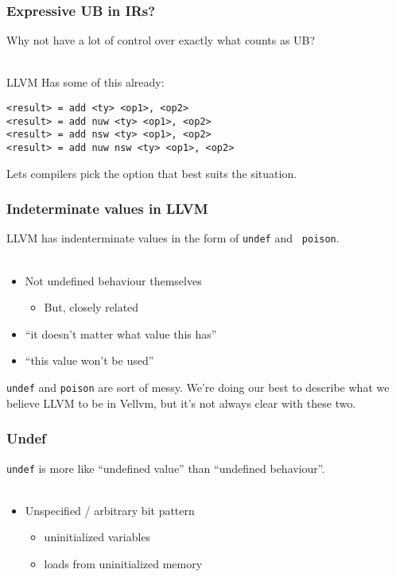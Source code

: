 \documentclass[handout]{beamer}
\begin{document}
\begin{frame}[fragile]
  \frametitle{Expressive UB in IRs?}

  Why not have a lot of control over exactly what counts as UB?\\~

  \pause

  LLVM Has some of this already:

\begin{verbatim}
<result> = add <ty> <op1>, <op2>
<result> = add nuw <ty> <op1>, <op2>
<result> = add nsw <ty> <op1>, <op2>
<result> = add nuw nsw <ty> <op1>, <op2>
\end{verbatim}

  Lets compilers pick the option that best suits the situation.
\end{frame}

\begin{frame}
  \frametitle{Indeterminate values in LLVM}

  LLVM has indenterminate values in the form of {\tt undef} and {\tt
    poison}.\\~

  \begin{itemize}
  \item Not undefined behaviour themselves
    \begin{itemize}
    \item But, closely related
    \end{itemize}
  \item ``it doesn't matter what value this has''
  \item ``this value won't be used''
  \end{itemize}

  \pause

  {\tt undef} and {\tt poison} are sort of messy. We're doing our best
  to describe what we believe LLVM to be in Vellvm, but it's not
  always clear with these two.

\end{frame}

\begin{frame}
  \frametitle{Undef}

  {\tt undef} is more like ``undefined value'' than ``undefined
  behaviour''.\\~

  \begin{itemize}
  \item Unspecified / arbitrary bit pattern
    \begin{itemize}
    \item uninitialized variables
    \item loads from uninitialized memory
    \end{itemize}
  \end{itemize}
\end{frame}
\end{document}
